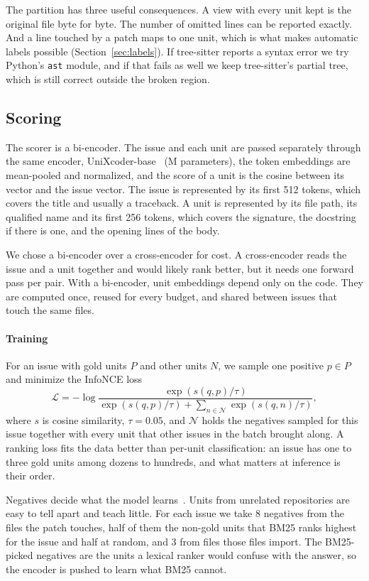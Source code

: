 The partition has three useful consequences. A view with every unit kept is the original file byte for byte. The number of omitted lines can be reported exactly. And a line touched by a patch maps to one unit, which is what makes automatic labels possible (Section~\ref{sec:labels}). If tree-sitter reports a syntax error we try Python's \texttt{ast} module, and if that fails as well we keep tree-sitter's partial tree, which is still correct outside the broken region.

\subsection{Scoring}

The scorer is a bi-encoder. The issue and each unit are passed separately through the same encoder, UniXcoder-base~\cite{unixcoder} (M parameters), the token embeddings are mean-pooled and normalized, and the score of a unit is the cosine between its vector and the issue vector. The issue is represented by its first 512 tokens, which covers the title and usually a traceback. A unit is represented by its file path, its qualified name and its first 256 tokens, which covers the signature, the docstring if there is one, and the opening lines of the body.

We chose a bi-encoder over a cross-encoder for cost. A cross-encoder reads the issue and a unit together and would likely rank better, but it needs one forward pass per pair. With a bi-encoder, unit embeddings depend only on the code. They are computed once, reused for every budget, and shared between issues that touch the same files.

\paragraph{Training} For an issue with gold units $P$ and other units $N$, we sample one positive $p \in P$ and minimize the InfoNCE loss~\cite{infonce}
\[
\mathcal{L} = -\log \frac{\exp(s(q,p)/\tau)}{\exp(s(q,p)/\tau) + \sum_{n \in \mathcal{N}} \exp(s(q,n)/\tau)},
\]
where $s$ is cosine similarity, $\tau = 0.05$, and $\mathcal{N}$ holds the negatives sampled for this issue together with every unit that other issues in the batch brought along. A ranking loss fits the data better than per-unit classification: an issue has one to three gold units among dozens to hundreds, and what matters at inference is their order.

Negatives decide what the model learns~\cite{dpr}. Units from unrelated repositories are easy to tell apart and teach little. For each issue we take 8 negatives from the files the patch touches, half of them the non-gold units that BM25 ranks highest for the issue and half at random, and 3 from files those files import. The BM25-picked negatives are the units a lexical ranker would confuse with the answer, so the encoder is pushed to learn what BM25 cannot.

